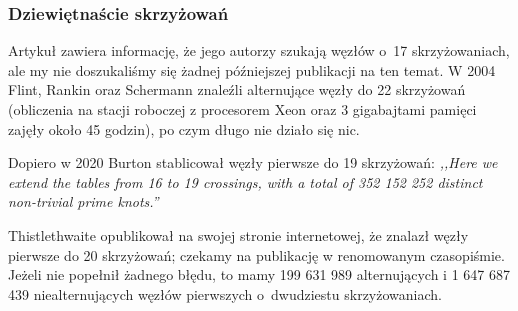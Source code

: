 
\subsubsection{Dziewiętnaście skrzyżowań}
Artykuł \cite{thistlethwaite98} zawiera informację, że jego autorzy szukają węzłów o~17 skrzyżowaniach, ale my nie doszukaliśmy się żadnej późniejszej publikacji na ten temat.
%
%
%
W 2004 Flint, Rankin oraz Schermann \cite{rankin04} znaleźli alternujące węzły do 22 skrzyżowań (obliczenia na stacji roboczej z procesorem Xeon oraz 3 gigabajtami pamięci zajęły około 45 godzin), po czym długo nie działo się nic.
%
%
%

Dopiero w 2020 Burton \cite{burton20} stablicował węzły pierwsze do 19 skrzyżowań: \emph{,,Here we extend the tables from 16 to 19 crossings, with a total of 352 152 252 distinct non-trivial prime knots.''}
%

Thistlethwaite opublikował na swojej stronie internetowej, że znalazł węzły pierwsze do 20 skrzyżowań; czekamy na publikację w renomowanym czasopiśmie.
Jeżeli nie popełnił żadnego błędu, to mamy 199 631 989 alternujących i 1 647 687 439 niealternujących węzłów pierwszych o~dwudziestu skrzyżowaniach.
%

